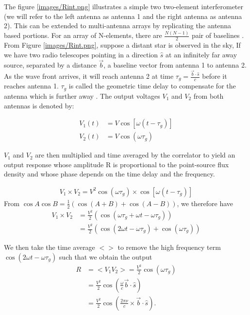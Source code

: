 The figure \ref{images/Rint.png} illustrates a simple two two-element interferometer (we will refer to the left antenna as antenna 1 and the right antenna as antenna 2). This can be extended to multi-antenna arrays by replicating the antenna based portions. For an array of N-elements, there are $\frac{N(N-1)}{2}$ pair of baselines \citep{zensus1995very}. From Figure \ref{images/Rint.png}, suppose a distant star is observed in the sky, If we have two radio telescopes pointing in a direction $\widehat{s}$ at an infinitely far away source, separated by a distance $\overrightarrow{b}$, a  baseline vector from antenna 1 to antenna 2. As the wave front arrives, it will reach antenna 2 at time $\tau_{g}=\frac{\overrightarrow{b}\cdot\widehat{s}}{c}$ before it reaches antenna 1. $\tau_{g}$ is called the geometric time delay to compensate for the antenna which is further away \citep{taylor1999synthesis}. The output voltages $V_1$ and $V_2$ from both antennas is  denoted by: 

\begin{equation}\label{eq111}
\begin{split}
V_1(t)&=V\cos[\omega(t-\tau_{g})] \\
V_2(t)&=V\cos(\omega\tau_{g})
\end{split}
\end{equation}

$V_1$ and $V_2$ are then  multiplied and time averaged by the correlator to yield an output response whose amplitude R is proportional to the point-source flux density and whose phase depends on the time delay and the frequency.

\begin{align}
V_1 \times V_2 = V^2 \cos(\omega\tau_{g})\times \cos[\omega(t-\tau_{g})]
\end{align}
From $\cos A\cos B= \frac{1}{2} \left(\cos (A+B) + \cos (A-B) \right)$, 
we therefore have 
\begin{align*}
V_1 \times V_2&= \frac{V^2}{2} \left( \cos(\omega\tau_{g} + \omega t-\omega \tau_{g} )\right)\\
&= \frac{V^2}{2} \left(\cos(2\omega t - \omega \tau_{g}) + \cos (\omega\tau_{g})\right)
\end{align*}

We then take the time average $<>$ to remove the high frequency term $\cos(2\omega t - \omega \tau_{g})$ such that we obtain the output 
\begin{align}
R&= <V_1V_2> = \frac{V^2}{2}  \cos (\omega\tau_{g})\\
  &= \frac{V^2}{2}  \cos \left( \frac{\omega}{c} \overrightarrow{b} \cdot \widehat{s} \right)\\
   &= \frac{V^2}{2}  \cos \left( \frac{2\pi \nu}{c} \times
   \overrightarrow{b} \cdot \widehat{s} \right). 
\end{align}

